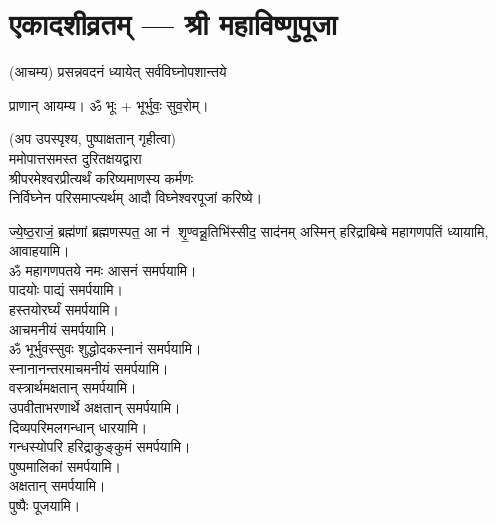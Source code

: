 
\setlength{\parindent}{0pt}
\section[एकादशीव्रतम्]{एकादशीव्रतम् --- श्री महाविष्णुपूजा}


(आचम्य)
{प्रसन्नवदनं ध्यायेत् सर्वविघ्नोपशान्तये}
 
प्राणान्  आयम्य।  ॐ भूः + भूर्भुवः॒ सुव॒रोम्।
 
(अप उपस्पृश्य, पुष्पाक्षतान् गृहीत्वा)\\
ममोपात्तसमस्त दुरितक्षयद्वारा \\
श्रीपरमेश्वरप्रीत्यर्थं करिष्यमाणस्य कर्मणः\\
 निर्विघ्नेन परिसमाप्त्यर्थम् आदौ विघ्नेश्वरपूजां करिष्ये।

{ज्ये॒ष्ठ॒राजं॒ ब्रह्म॑णां ब्रह्मणस्पत॒ आ न॑ शृ॒ण्वन्नू॒तिभि॑स्सीद॒ साद॑नम्}
अस्मिन् हरिद्राबिम्बे महागणपतिं ध्यायामि, आवाहयामि।\\


ॐ महागणपतये नमः  आसनं समर्पयामि।\\
पादयोः पाद्यं समर्पयामि।\\
हस्तयोरर्घ्यं समर्पयामि।\\
आचमनीयं समर्पयामि।\\
ॐ भूर्भुवस्सुवः शुद्धोदकस्नानं समर्पयामि।\\
स्नानानन्तरमाचमनीयं समर्पयामि।\\
वस्त्रार्थमक्षतान् समर्पयामि।\\
उपवीताभरणार्थे अक्षतान् समर्पयामि।\\
दिव्यपरिमलगन्धान् धारयामि।\\
गन्धस्योपरि हरिद्राकुङ्कुमं समर्पयामि।\\
पुष्पमालिकां समर्पयामि।\\
अक्षतान् समर्पयामि।\\
पुष्पैः पूजयामि।

